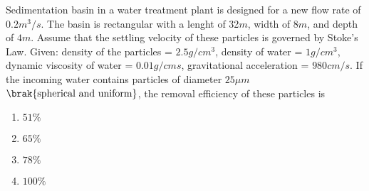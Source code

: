     \item Sedimentation basin in a water treatment plant is designed for a new flow rate of $0.2m^3/s$.
        The basin is rectangular with a lenght of 32$m$, width of $8m$, and depth of $4m$. Assume that the
        settling velocity of these particles is governed by Stoke's Law. Given: density of the particles = 
        $2.5g/cm^3$, density of water = $1 g/cm^3$, dynamic viscosity of water = $0.01 g/cm s$, gravitational
        acceleration = $980 cm/s$. If the incoming water contains particles of diameter $25 \mu m$ 
        $\brak{\text{spherical and uniform}}$, the removal efficiency of these particles is
        \hfill{}
     \begin{multicols}{4}
            \begin{enumerate}
                \item $51\%$
                    \columnbreak
                \item $65\%$
                    \columnbreak
                \item $78\%$
                    \columnbreak
                \item $100\%$
            \end{enumerate}
        \end{multicols}

